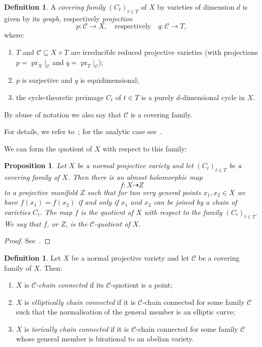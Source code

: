 \documentclass[11pt]{article}
\newtheorem{prop}[theo]{Proposition}
\theoremstyle{definition}
\newtheorem{defi}[theo]{Definition}
\numberwithin{equation}{section}
\numberwithin{figure}{section}
\numberwithin{table}{section}
\DeclareMathOperator{\pr}{pr}
\newcommand\sC{\mathcal{C}}
\newcommand*{\alphenumi}{\renewcommand*{\theenumi}{\alph{enumi}}}
\begin{document}
\begin{defi}\label{def:main4.1}
A \emph{covering family} $(C_t)_{t \in T}$ of $X$ by varieties of dimension $d$ is given by its \emph{graph}, respectively \emph{projection}
\[
p\colon \sC \to X,\quad \text{respectively}\quad q \colon \sC \to T,
\]
where:
\begin{enumerate}\alphenumi
\item \label{list-4.1.1}$T$ and $\sC \subseteq X \times T$ are irreducible reduced projective varieties (with projections $p = \pr_X|_\sC$ and $q = \pr_T|_\sC$);
\item \label{list-4.1.2}$p$ is surjective and $q$ is equidimensional;
\item \label{list-4.1.3}the cycle-theoretic preimage $C_t$ of $t \in T$ is a purely $d$-dimensional cycle in $X$.
\end{enumerate}
By abuse of notation we also say that $\sC$ is a covering family.
\end{defi}

For details, we refer to~\cite[Section I.4]{Kol96}; for the analytic case see~\cite{Bar75,BM14}.

We can form the quotient of $X$ with respect to this family:

\begin{prop}\label{quot}
Let $X$ be a normal projective variety and let $(C_t)_{t \in T}$ be a covering family of $X$. Then there is an almost holomorphic map
\[
f\colon X \dasharrow Z
\]
to a projective manifold $Z$ such that for two very general points $x_1,x_2 \in X$ we have $f(x_1) = f(x_2)$ if and only if $x_1 $ and $x_2$ can be joined by a chain of varieties $C_t$. The map $f$ is \emph{the quotient of $X$ with respect to the family $(C_t)_{t\in T}$}. We say that $f$, or $Z$, is the \emph{$\sC$-quotient of $X$}.
\end{prop}

\begin{proof}
See~\cite{Ca81,Ca04}.
\end{proof}

\begin{defi}\label{def:main4.3}
Let $X$ be a normal projective variety and let $\sC$ be a covering family of $X$. Then:
\begin{enumerate}\alphenumi
\item \label{list-4.3.1}$X$ is \emph{$\sC$-chain connected} if its $\sC$-quotient is a point;
\item \label{list-4.3.2}$X$ is \emph{elliptically chain connected} if it is $\sC$-chain connected for some family $\sC$ such that the normalisation of the general member is an elliptic curve;
\item \label{list-4.3.3}$X$ is \emph{torically chain connected} if it is $\sC$-chain connected for some family $\sC$ whose general member is birational to an abelian variety.
\end{enumerate}
\end{defi}
\end{document}
